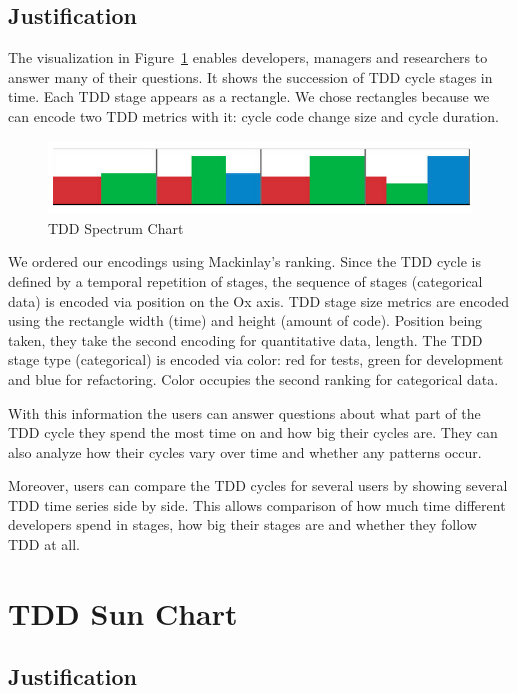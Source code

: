 \documentclass[journal]{vgtc}                %
\begin{document}
\subsection{Justification}

The visualization in Figure~\ref{fig:two} enables developers, managers and researchers to answer many of their questions. It shows the succession of TDD cycle stages in time. Each TDD stage appears as a rectangle. We chose rectangles because we can encode two TDD metrics with it: cycle code change size and cycle duration.

\begin{figure}
	\includegraphics[width=\textwidth]{fig2.png}
	\caption{TDD Spectrum Chart}
	\label{fig:two}
\end{figure}

We ordered our encodings using Mackinlay's ranking.
Since the TDD cycle is defined by a temporal repetition of stages, the sequence of stages (categorical data) is encoded via position on the Ox axis.
TDD stage size metrics are encoded using the rectangle width (time) and height (amount of code). Position being taken, they take the second encoding for quantitative data, length.
The TDD stage type (categorical) is encoded via color: red for tests, green for development and blue for refactoring. Color occupies the second ranking for categorical data.

With this information the users can answer questions about what part of the TDD cycle they spend the most time on and how big their cycles are. They can also analyze how their cycles vary over time and whether any patterns occur.

Moreover, users can compare the TDD cycles for several users by showing several TDD time series side by side. This allows comparison of how much time different developers spend in stages, how big their stages are and whether they follow TDD at all.

\section{TDD Sun Chart}

\subsection{Justification}
\end{document}
